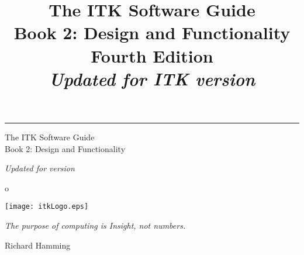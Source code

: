 \documentclass{InsightSoftwareGuide}
\title{The ITK Software Guide\\Book 2: Design and Functionality\\Fourth Edition\\ \emph{Updated for ITK version
\ITKVERSIONMAJORMINOR}}
\begin{document}
\ifitkPrintedVersion

  \begin{minipage}[t][3cm][b]{\textwidth}
  \rule{14cm}{1pt}
  \end{minipage}

  \begin{minipage}[t][3cm][b]{\textwidth}
  \Huge
  The ITK Software Guide\\
  Book 2: Design and Functionality\\
  \normalsize
  \par
  \emph{Updated for version \ITKVERSIONMAJORMINOR}\\

  \end{minipage}

  
  

\fi

\maketitle

\frontmatter



%
o
%
\cleardoublepage

\begin{minipage}[t][10cm][b]{\textwidth}
\center
\texttt{[image: itkLogo.eps]}
\large
\begin{center}
\emph{The purpose of computing is Insight, not numbers.}\\
\end{center}
\hspace{8cm} Richard Hamming
\normalsize
\end{minipage}



%
\pagestyle{plain}
%


\ifitkPrintedVersion
  
\fi

\ifitkFullVersion
  
  
  
\fi



%
%
\end{document}
